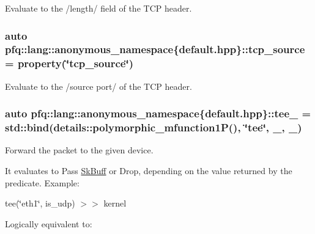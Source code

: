 Evaluate to the /length/ field of the T\+C\+P header. 

\hypertarget{namespacepfq_1_1lang_1_1anonymous__namespace_02default_8hpp_03_a367a9ec6d91677553073c54a059b391d}{
\subsubsection[{tcp\+\_\+source}]{\setlength{\rightskip}{0pt plus 5cm}auto pfq\+::lang\+::anonymous\+\_\+namespace\{default.\+hpp\}\+::tcp\+\_\+source = {\bf property}(\char`\"{}tcp\+\_\+source\char`\"{})}}\label{namespacepfq_1_1lang_1_1anonymous__namespace_02default_8hpp_03_a367a9ec6d91677553073c54a059b391d}


Evaluate to the /source port/ of the T\+C\+P header. 

\hypertarget{namespacepfq_1_1lang_1_1anonymous__namespace_02default_8hpp_03_aa4d28339a059595643ad1b7a30dc887f}{
\subsubsection[{tee\+\_\+}]{\setlength{\rightskip}{0pt plus 5cm}auto pfq\+::lang\+::anonymous\+\_\+namespace\{default.\+hpp\}\+::tee\+\_\+ = std\+::bind(details\+::polymorphic\+\_\+mfunction1\+P(), \char`\"{}tee\char`\"{}, \+\_, \+\_)}}\label{namespacepfq_1_1lang_1_1anonymous__namespace_02default_8hpp_03_aa4d28339a059595643ad1b7a30dc887f}


Forward the packet to the given device. 

It evaluates to {\ttfamily Pass} \hyperlink{structpfq_1_1lang_1_1SkBuff}{Sk\+Buff} or {\ttfamily Drop}, depending on the value returned by the predicate. Example\+:

tee(\char`\"{}eth1\char`\"{}, is\+\_\+udp) $>$$>$ kernel

Logically equivalent to\+:


